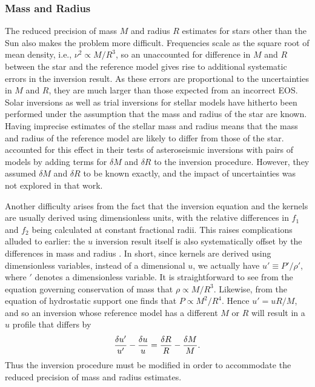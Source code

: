 \subsubsection*{Mass and Radius}
The reduced precision of mass $M$ and radius $R$ estimates for stars other than the Sun also makes the problem more difficult. 
Frequencies scale as the square root of mean density, i.e., ${\nu^2 \propto M/R^3}$, so an unaccounted for difference in $M$ and $R$ between the star and the reference model gives rise to additional systematic errors in the inversion result. 
As these errors are proportional to the uncertainties in $M$ and $R$, they are much larger than those expected from an incorrect EOS. 
Solar inversions as well as trial inversions for stellar models have hitherto been performed under the assumption that the mass and radius of the star are known. 
Having imprecise estimates of the stellar mass and radius means that the mass and radius of the reference model are likely to differ from those of the star. 
\citet{2001ESASP.464..411B} accounted for this effect in their tests of asteroseismic inversions with pairs of models by adding terms for $\delta M$ and $\delta R$ to the inversion procedure. 
However, they assumed $\delta M$ and $\delta R$ to be known exactly, and the impact of uncertainties was not explored in that work. 


Another difficulty arises from the fact that the inversion equation and the kernels are usually derived using dimensionless units, with the relative differences in $f_1$ and $f_2$ being calculated at constant fractional radii.
This raises complications alluded to earlier: the $u$ inversion result itself is also systematically offset by the differences in mass and radius \citep{2003Ap&SS.284..153B}.
In short, since kernels are derived using dimensionless variables, instead of a dimensional $u$, we actually have ${u' \equiv P'/\rho'}$, where $'$ denotes a dimensionless variable. 
It is straightforward to see from the equation governing conservation of mass that ${\rho \propto M/R^3}$. 
Likewise, from the equation of hydrostatic support one finds that ${P \propto M^2/R^4}$. 
Hence ${u'=uR/M}$, and so an inversion whose reference model has a different $M$ or $R$ will result in a $u$ profile that differs by
\begin{equation} \label{eq:MR}
    \frac{\delta u'}{u'} - \frac{\delta u}{u} = \frac{\delta R}{R} - \frac{\delta M}{M}.
\end{equation}
Thus the inversion procedure must be modified in order to accommodate the reduced precision of mass and radius estimates. 

